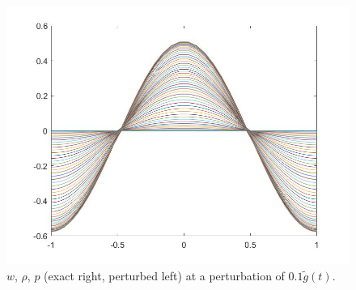 \documentclass[11pt, a4paper]{article}
\theoremstyle{definition}
\begin{document}
\begin{figure}[h]
	\includegraphics[scale=0.3]{Nexpp2.jpg}
	\caption{$w$, $\rho$, $p$ (exact right, perturbed left) at a perturbation of $0.1 \tilde g(t)$.}
	\label{Nexperr1}
\end{figure}
\end{document}
